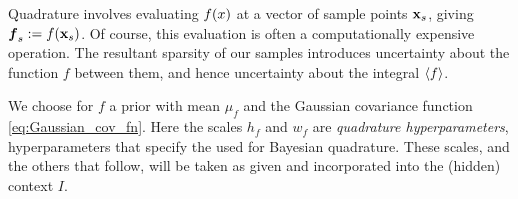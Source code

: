 \documentclass{article}
\begin{document}
Quadrature involves evaluating $f(\lfv)$ at a vector of sample points $\vlfv_s$, giving $\vf\pha_s\deq f(\vlfv_s)$. Of course, this evaluation is often a computationally expensive operation. The resultant sparsity of our samples introduces uncertainty about the function $f$ between them, and hence uncertainty about the integral $\inty{f}$.



We choose for $f$ a \gpb prior with mean $\mu_f$ and the Gaussian covariance function \eqref{eq:Gaussian_cov_fn}. Here the scales $h_f$ and $w_f$ are \emph{quadrature hyperparameters}, hyperparameters that specify the  \gpb used for Bayesian quadrature. These scales, and the others that follow, will be taken as given and incorporated into the (hidden) context $I$.

\end{document}
